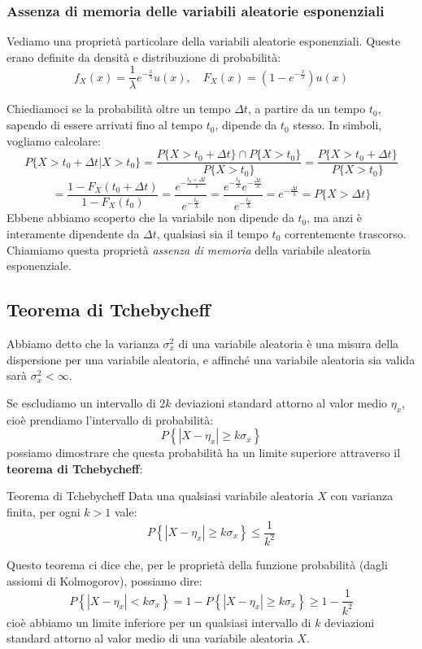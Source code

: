 \documentclass[a4paper,11pt]{article}
\begin{document}
\subsubsection{Assenza di memoria delle variabili aleatorie esponenziali}
Vediamo una proprietà particolare della variabili aleatorie esponenziali. Queste erano definite da densità e distribuzione di probabilità:
$$
f_X(x) = \frac{1}{\lambda} e^{-\frac{x}{\lambda}} u(x), \quad
F_X(x) = \left( 1 - e^{-\frac{x}{\lambda}} \right) u(x)
$$

Chiediamoci se la probabilità oltre un tempo $\Delta t$, a partire da un tempo $t_0$, sapendo di essere arrivati fino al tempo $t_0$, dipende da $t_0$ stesso. In simboli, vogliamo calcolare:
$$
P\{ X > t_0 + \Delta t | X > t_0 \} = \frac{ P\{ X > t_0 + \Delta t \} \cap P\{ X > t_0 \} }{ P\{ X > t_0 \} } = \frac{ P\{ X > t_0 + \Delta t \} }{ P\{ X > t_0 \} }
$$
$$
= \frac{1 - F_X(t_0 + \Delta t)}{1 - F_X(t_0)} 
= \frac{e^{-\frac{t_0 + \Delta t}{\lambda}}}{e^{-\frac{t_0}{\lambda}}}
= \frac{e^{-\frac{t_0}{\lambda}}e^{-\frac{\Delta t}{\lambda}}}{e^{-\frac{t_0}{\lambda}}} = e^{-\frac{\Delta t}{\lambda}} = P\{X > \Delta t\}
$$
Ebbene abbiamo scoperto che la variabile non dipende da $t_0$, ma anzi è interamente dipendente da $\Delta t$, qualsiasi sia il tempo $t_0$ correntemente trascorso. Chiamiamo questa proprietà \textit{assenza di memoria} della variabile aleatoria esponenziale.

\subsection{Teorema di Tchebycheff}
Abbiamo detto che la varianza $\sigma_x^2$ di una variabile aleatoria è una misura della dispersione per una variabile aleatoria, e affinché una variabile aleatoria sia valida sarà $\sigma_x^2 < \infty$.

Se escludiamo un intervallo di $2 k$ deviazioni standard attorno al valor medio $\eta_x$, cioè prendiamo l'intervallo di probabilità:
$$
P\left\{ |X - \eta_x| \geq k \sigma_x \right\}
$$
possiamo dimostrare che questa probabilità ha un limite superiore attraverso il \textbf{teorema di Tchebycheff}:
\begin{theorem}{Teorema di Tchebycheff}
Data una qualsiasi variabile aleatoria $X$ con varianza finita, per ogni $k > 1$ vale:
$$
P\left\{ |X - \eta_x| \geq k \sigma_x \right\} \leq \frac{1}{k^2}
$$
\end{theorem}

Questo teorema ci dice che, per le proprietà della funzione probabilità (dagli assiomi di Kolmogorov), possiamo dire:
$$
P\left\{ |X - \eta_x| < k \sigma_x \right\} = 1 - P\left\{ |X - \eta_x| \geq k \sigma_x \right\} \geq 1 - \frac{1}{k^2}
$$
cioè abbiamo un limite inferiore per un qualsiasi intervallo di $k$ deviazioni standard attorno al valor medio di una variabile aleatoria $X$.
\end{document}
